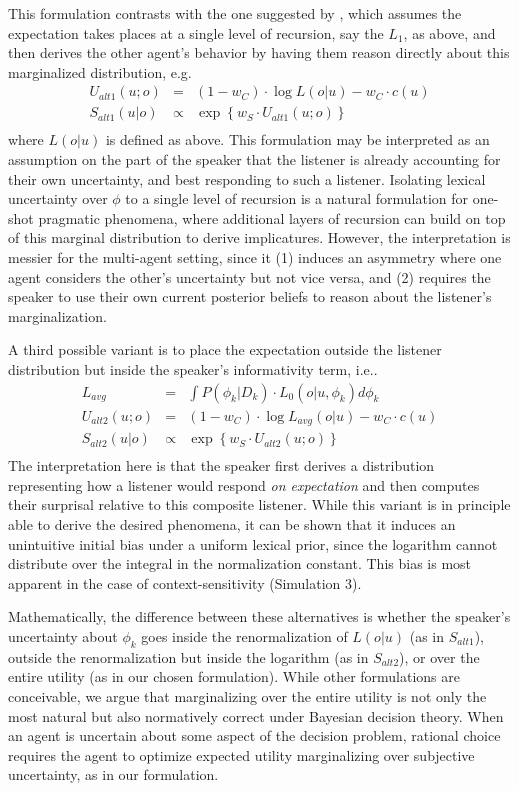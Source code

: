 \documentclass[11pt, floatsintext]{apa6}
\begin{document}
This formulation contrasts with the one suggested by , which assumes the expectation takes places at a single level of recursion, say the $L_1$, as above, and then derives the other agent's behavior by having them reason directly about this marginalized distribution, e.g.
$$
\begin{array}{rcl}
U_{alt1}(u;o) & = & (1-w_C) \cdot \log L(o|u) - w_C \cdot c(u)\\
S_{alt1}(u|o) & \propto & \exp\left\{w_S \cdot U_{alt1}(u;o)\right\} \\
\end{array}
$$
where $L(o|u)$ is defined as above.
This formulation may be interpreted as an assumption on the part of the speaker that the listener is already accounting for their own uncertainty, and best responding to such a listener.
Isolating lexical uncertainty over $\phi$ to a single level of recursion is a natural formulation for one-shot pragmatic phenomena, where additional layers of recursion can build on top of this marginal distribution to derive implicatures.
However, the interpretation is messier for the multi-agent setting, since it (1) induces an asymmetry where one agent considers the other's uncertainty but not vice versa, and (2) requires the speaker to use their own current posterior beliefs to reason about the listener's marginalization.

A third possible variant is to place the expectation outside the listener distribution but inside the speaker's informativity term, i.e..
$$
\begin{array}{rcl}
L_{avg} & = & \int P(\phi_k | D_k)\cdot L_0(o|u, \phi_k) d\phi_k \\
U_{alt2}(u;o) & = & (1-w_C) \cdot \log L_{avg}(o|u) - w_C \cdot c(u)\\
S_{alt2}(u|o) & \propto & \exp\left\{w_S \cdot U_{alt2}(u;o)\right\} \\
\end{array}
$$
The interpretation here is that the speaker first derives a distribution representing how a listener would respond \emph{on expectation} and then computes their surprisal relative to this composite listener.
While this variant is in principle able to derive the desired phenomena, it can be shown that it induces an unintuitive initial bias under a uniform lexical prior, since the logarithm cannot distribute over the integral in the normalization constant. 
This bias is most apparent in the case of context-sensitivity (Simulation 3).

Mathematically, the difference between these alternatives is whether the speaker's uncertainty about $\phi_k$ goes inside the renormalization of $L(o|u)$ (as in $S_{alt1}$), outside the renormalization but inside the logarithm (as in $S_{alt2}$), or over the entire utility (as in our chosen formulation).
While other formulations are conceivable, we argue that marginalizing over the entire utility is not only the most natural but also normatively correct under Bayesian decision theory. 
When an agent is uncertain about some aspect of the decision problem, rational choice requires the agent to optimize expected utility marginalizing over subjective uncertainty, as in our formulation. 
\end{document}
